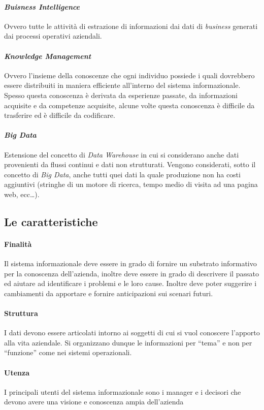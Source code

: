         \paragraph{\textit{Buisness Intelligence}} Ovvero tutte le attività di estrazione di informazioni dai dati di \textit{business} generati dai processi operativi aziendali.
        \paragraph{\textit{Knowledge Management}} Ovvero l'insieme della conoscenze che ogni individuo possiede i quali dovrebbero essere distribuiti in maniera efficiente all'interno del sistema informazionale. Spesso questa conoscenza è derivata da esperienze passate, da informazioni acquisite e da competenze acquisite, alcune volte questa conoscenza è difficile da trasferire ed è difficile da codificare.
        \paragraph{\textit{Big Data}} Estensione del concetto di \textit{Data Warehouse} in cui si considerano anche dati provenienti da flussi continui e dati non strutturati. Vengono considerati, sotto il concetto di \textit{Big Data}, anche tutti quei dati la quale produzione non ha costi aggiuntivi (stringhe di un motore di ricerca, tempo medio di visita ad una pagina web, ecc\dots). 
    \subsection{Le caratteristiche}
        \paragraph{Finalità} Il sistema informazionale deve essere in grado di fornire un substrato informativo per la conoscenza dell'azienda, inoltre deve essere in grado di descrivere il passato ed aiutare ad identificare i problemi e le loro cause. Inoltre deve poter suggerire i cambiamenti da apportare e fornire anticipazioni sui scenari futuri. 
        \paragraph{Struttura} I dati devono essere articolati intorno ai soggetti di cui si vuol conoscere l'apporto alla vita aziendale. Si organizzano dunque le informazioni per ``tema'' e non per ``funzione'' come nei sistemi operazionali.
        \paragraph{Utenza} I principali utenti del sistema informazionale sono i manager e i decisori che devono avere una visione e conoscenza ampia dell'azienda

